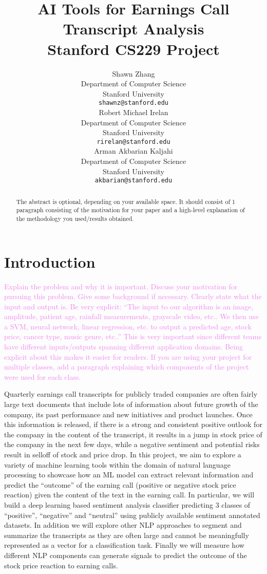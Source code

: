 \documentclass{article}
\title{
  AI Tools for Earnings Call Transcript Analysis \\
  \vspace{1em}
  \small{\normalfont Stanford CS229 Project}  %
}
\author{
  Shawn Zhang  \\
  Department of Computer Science \\
  Stanford University \\
  \texttt{shawnz@stanford.edu} \\
   \And
  Robert Michael Irelan \\
  Department of Computer Science \\
  Stanford University \\
  \texttt{rirelan@stanford.edu} \\
   \And
Arman Akbarian Kaljahi  \\
  Department of Computer Science \\
  Stanford University \\
  \texttt{akbarian@stanford.edu} \\
}
\newcommand{\instructions}[1]{\textcolor{violet}{{#1}}}
\begin{document}
\maketitle

\begin{abstract}
The abstract is optional, depending on your available space. It should consist of 1 paragraph consisting of the motivation for your paper and a high-level explanation of the methodology you used/results obtained.
\end{abstract}



\section{Introduction}
\instructions{%
Explain the problem and why it is important. Discuss your motivation for pursuing this problem. Give some background if necessary. Clearly state what the input and output is. Be very explicit: “The input to our algorithm is an {image, amplitude, patient age, rainfall measurements, grayscale video, etc.}. We then use a {SVM, neural network, linear regression, etc.} to output a predicted {age, stock price, cancer type, music genre, etc.}.” This is very important since different teams have different inputs/outputs spanning different application domains. Being explicit about this makes it easier for readers. If you are using your project for multiple classes, add a paragraph explaining which components of the project were used for each class.}

Quarterly earnings call transcripts for publicly traded companies are often fairly large text documents that include lots of information about future growth of the company, its past performance and new initiatives and product launches. Once this information is released, if there is a strong and consistent positive outlook for the company in the content of the transcript, it results in a jump in stock price of the company in the next few days, while a negative sentiment and potential risks result in selloff of stock and price drop. In this project, we aim to explore a variety of machine learning tools within the domain of natural language processing to showcase how an ML model can extract relevant information and predict the “outcome” of the earning call (positive or negative stock price reaction) given the content of the text in the earning call. In particular, we will build a deep learning based sentiment analysis classifier predicting 3 classes of “positive”, “negative” and “neutral” using publicly available sentiment annotated datasets. In addition we will explore other NLP approaches to segment and summarize the transcripts as they are often large and cannot be meaningfully represented as a vector for a classification task. Finally we will measure how different NLP components can generate signals to predict the outcome of the stock price reaction to earning calls. 
\end{document}

